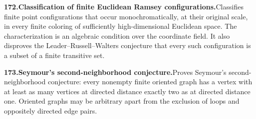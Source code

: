 \documentclass[11pt,a4paper]{article}
\begin{document}
  \par \begin{minipage}{\linewidth}
  \fontsize{10.5}{12.6}\selectfont\RaggedRight
  \hypertarget{result 172}{}
  {\bfseries\textcolor{muted}{172.}\enspace Classification of finite Euclidean Ramsey configurations.}\enspace Classifies finite point configurations that occur monochromatically, at their original scale, in every finite coloring of sufficiently high-dimensional Euclidean space. The characterization is an algebraic condition over the coordinate field. It also disproves the Leader--Russell--Walters conjecture that every such configuration is a subset of a finite transitive set.\par
  \end{minipage}\par\vspace{5pt}



  \par \begin{minipage}{\linewidth}
  \fontsize{10.5}{12.6}\selectfont\RaggedRight
  \hypertarget{result 173}{}
  {\bfseries\textcolor{muted}{173.}\enspace Seymour's second-neighborhood conjecture.}\enspace Proves Seymour's second-neighborhood conjecture: every nonempty finite oriented graph has a vertex with at least as many vertices at directed distance exactly two as at directed distance one. Oriented graphs may be arbitrary apart from the exclusion of loops and oppositely directed edge pairs.\par
  \end{minipage}\par\vspace{5pt}
\end{document}
